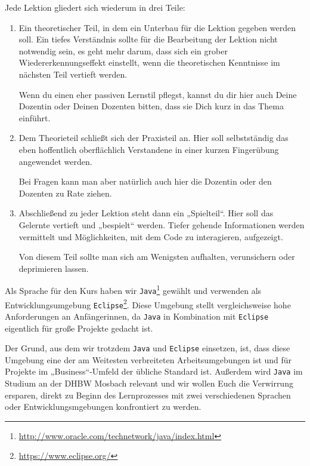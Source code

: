 \documentclass{vorkurs}
\newcommand{\swname}[1]{\texttt{#1}\xspace}
\newcommand{\Java}{\swname{Java}}
\newcommand{\Eclipse}{\swname{Eclipse}}
\begin{document}
Jede Lektion gliedert sich wiederum in drei Teile:
\begin{enumerate}
\item Ein theoretischer Teil, in dem ein Unterbau für die Lektion gegeben werden
  soll. Ein tiefes Verständnis sollte für die Bearbeitung der Lektion nicht
  notwendig sein, es geht mehr darum, dass sich ein grober
  Wiedererkennungseffekt einstellt, wenn die theoretischen Kenntnisse im
  nächsten Teil vertieft werden.

  Wenn du einen eher passiven Lernstil pflegst, kannst du dir hier auch Deine
  Dozentin oder Deinen Dozenten bitten, dass sie Dich kurz in das Thema
  einführt.
\item Dem Theorieteil schließt sich der Praxisteil an. Hier soll selbstständig
  das eben hoffentlich oberflächlich Verstandene in einer kurzen Fingerübung
  angewendet werden.

  Bei Fragen kann man aber natürlich auch hier die Dozentin oder den Dozenten zu
  Rate ziehen.
\item Abschließend zu jeder Lektion steht dann ein „Spielteil“. Hier soll das
  Gelernte vertieft und „bespielt“ werden. Tiefer gehende Informationen werden
  vermittelt und Möglichkeiten, mit dem Code zu interagieren, aufgezeigt.

  Von diesem Teil sollte man sich am Wenigsten aufhalten, verunsichern oder
  deprimieren lassen.
\end{enumerate}

Als Sprache für den Kurs haben wir
\Java\footnote{\url{http://www.oracle.com/technetwork/java/index.html}} gewählt
und verwenden als Entwicklungsumgebung
\Eclipse\footnote{\url{https://www.eclipse.org/}}. Diese Umgebung stellt
vergleichsweise hohe Anforderungen an Anfängerinnen, da \Java in Kombination mit
\Eclipse eigentlich für große Projekte gedacht ist.

Der Grund, aus dem wir trotzdem \Java und \Eclipse einsetzen, ist, dass diese
Umgebung eine der am Weitesten verbreiteten Arbeitsumgebungen ist und für
Projekte im „Business“-Umfeld der übliche Standard ist. Außerdem wird \Java im
Studium an der DHBW Mosbach relevant und wir wollen Euch die Verwirrung
ersparen, direkt zu Beginn des Lernprozesses mit zwei verschiedenen Sprachen
oder Entwicklungsmgebungen konfrontiert zu werden.

\end{document}
